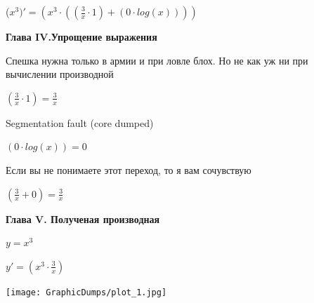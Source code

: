 \documentclass[12pt,a4paper,fleqn]{article}
\begin{document}
\begin{center}
 ($x^{3})'
  = (x^{3} \cdot ((\frac{3}{x} \cdot 1) + (0 \cdot log(x))))$\end{center}
\newpage \textbf{\LARGE Глава IV.Упрощение выражения}

Спешка нужна только в армии и при ловле блох. Но не как уж ни при вычислении производной

\begin{center}
$(\frac{3}{x} \cdot 1) = \frac{3}{x}$\end{center}
Segmentation fault (core dumped)

\begin{center}
$(0 \cdot log(x)) = 0$\end{center}
Если вы не понимаете этот переход, то я вам сочувствую

\begin{center}
$(\frac{3}{x} + 0) = \frac{3}{x}$\end{center}
\newpage \textbf{\LARGE Глава V. Полученая производная}

$y = $$x^{3}$

$y' = $$(x^{3} \cdot \frac{3}{x})$

\texttt{[image: GraphicDumps/plot\_1.jpg]}
\end{document}
